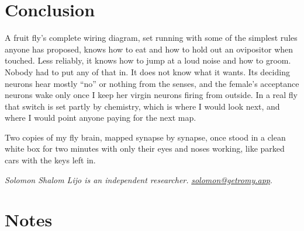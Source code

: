 \documentclass[11pt,a4paper]{article}
\begin{document}
\section{Conclusion}
\label{sec:conclusion}

A fruit fly's complete wiring diagram, set running with some of the simplest rules anyone has proposed, knows how to eat and how to hold out an ovipositor when touched. Less reliably, it knows how to jump at a loud noise and how to groom. Nobody had to put any of that in. It does not know what it wants. Its deciding neurons hear mostly ``no'' or nothing from the senses, and the female's acceptance neurons wake only once I keep her virgin neurons firing from outside. In a real fly that switch is set partly by chemistry, which is where I would look next, and where I would point anyone paying for the next map.

Two copies of my fly brain, mapped synapse by synapse, once stood in a clean white box for two minutes with only their eyes and noses working, like parked cars with the keys left in.

\bigskip
\noindent\emph{Solomon Shalom Lijo is an independent researcher.} \href{mailto:solomon@getromy.app}{\emph{solomon@getromy.app}}.

\clearpage
\section*{Notes}
\small
\end{document}

